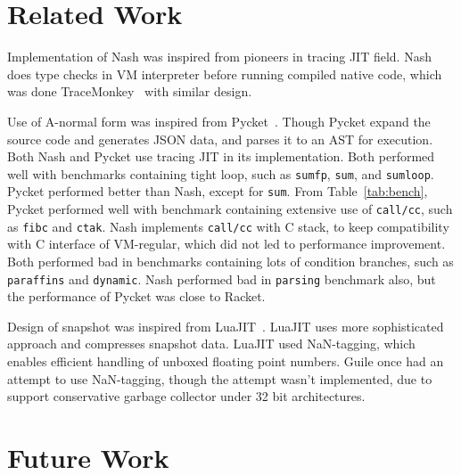 \documentclass[preprint]{sigplanconf}
\begin{document}

\section{Related Work}
\label{sec:related}
Implementation of Nash was inspired from pioneers in tracing JIT field. Nash
does type checks in VM interpreter before running compiled native code, which
was done TraceMonkey~\cite{gal2009trace} with similar design.

Use of A-normal form was inspired from Pycket~\cite{bauman2015pycket}. Though
Pycket expand the source code and generates JSON data, and parses it to an AST
for execution.  Both Nash and Pycket use tracing JIT in its implementation. Both
performed well with benchmarks containing tight loop, such as \texttt{sumfp},
\texttt{sum}, and \texttt{sumloop}. Pycket performed better than Nash, except
for \texttt{sum}. From Table~\hyperref[tab:bench]{\ref{tab:bench}}, Pycket
performed well with benchmark containing extensive use of \texttt{call/cc}, such
as \texttt{fibc} and \texttt{ctak}. Nash implements \texttt{call/cc} with C
stack, to keep compatibility with C interface of VM-regular, which did not led
to performance improvement. Both performed bad in benchmarks containing lots of
condition branches, such as \texttt{paraffins} and \texttt{dynamic}. Nash
performed bad in \texttt{parsing} benchmark also, but the performance of Pycket
was close to Racket.

Design of snapshot was inspired from LuaJIT~\cite{pall2009ip}. LuaJIT
uses more sophisticated approach and compresses snapshot data. LuaJIT used
NaN-tagging, which enables efficient handling of unboxed floating point
numbers. Guile once had an attempt to use NaN-tagging, though the attempt wasn't
implemented, due to support conservative garbage collector under 32 bit
architectures.


\section{Future Work}
\label{sec:future}
\end{document}
